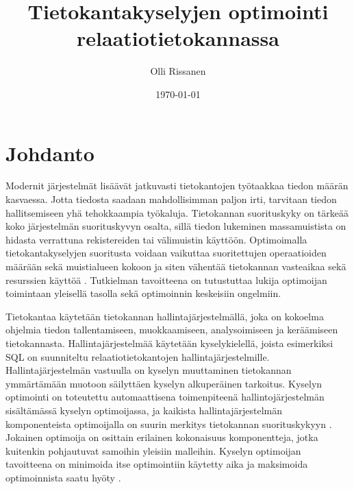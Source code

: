 \documentclass[finnish]{tktltiki2}
\title{Tietokantakyselyjen optimointi relaatiotietokannassa}
\author{Olli Rissanen}
\date{\today}
\theoremstyle{definition}
\theoremstyle{remark}
\begin{document}

\maketitle
\makeabstract
\tableofcontents
\newpage

\setlength{\parskip}{\medskipamount}
\setlength{\parindent}{0pt}



\section{Johdanto}
Modernit järjestelmät lisäävät jatkuvasti tietokantojen työtaakkaa tiedon määrän kasvaessa. Jotta tiedosta saadaan mahdollisimman paljon irti, tarvitaan tiedon hallitsemiseen yhä tehokkaampia työkaluja. %
Tietokannan suorituskyky on tärkeää koko järjestelmän suorituskyvyn osalta, sillä tiedon lukeminen massamuistista on hidasta verrattuna rekistereiden tai välimuistin käyttöön. Optimoimalla tietokantakyselyjen suoritusta voidaan vaikuttaa suoritettujen operaatioiden määrään sekä muistialueen kokoon ja siten vähentää tietokannan vasteaikaa sekä resurssien käyttöä \cite{mor2012}.  Tutkielman tavoitteena on tutustuttaa lukija optimoijan toimintaan yleisellä tasolla sekä optimoinnin keskeisiin ongelmiin. 
	
% 

Tietokantaa käytetään tietokannan hallintajärjestelmällä, joka on kokoelma ohjelmia tiedon tallentamiseen, muokkaamiseen, analysoimiseen ja keräämiseen tietokannasta. Hallintajärjestelmää käytetään kyselykielellä, joista esimerkiksi SQL \cite{5391051} on suunniteltu relaatiotietokantojen hallintajärjestelmille. Hallintajärjestelmän vastuulla on kyselyn muuttaminen tietokannan ymmärtämään muotoon säilyttäen kyselyn alkuperäinen tarkoitus. Kyselyn optimointi on toteutettu automaattisena toimenpiteenä hallintojärjestelmän sisältämässä kyselyn optimoijassa, ja kaikista hallintajärjestelmän komponenteista optimoijalla on suurin merkitys tietokannan suorituskykyyn \cite{mor2012}. Jokainen optimoija on osittain erilainen kokonaisuus komponentteja, jotka kuitenkin pohjautuvat samoihin yleisiin malleihin. Kyselyn optimoijan tavoitteena on minimoida itse optimointiin käytetty aika ja maksimoida optimoinnista saatu hyöty \cite{jarke1984}. 
\end{document}
